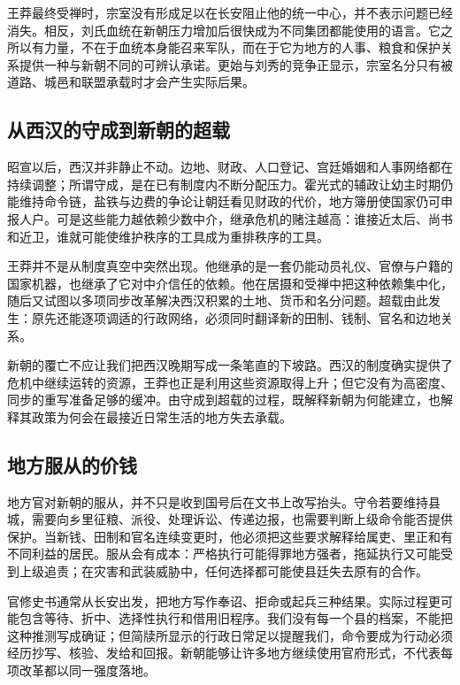 王莽最终受禅时，宗室没有形成足以在长安阻止他的统一中心，并不表示问题已经消失。相反，刘氏血统在新朝压力增加后很快成为不同集团都能使用的语言。它之所以有力量，不在于血统本身能召来军队，而在于它为地方的人事、粮食和保护关系提供一种与新朝不同的可辨认承诺。更始与刘秀的竞争正显示，宗室名分只有被道路、城邑和联盟承载时才会产生实际后果。

\subsection{从西汉的守成到新朝的超载}

昭宣以后，西汉并非静止不动。边地、财政、人口登记、宫廷婚姻和人事网络都在持续调整；所谓守成，是在已有制度内不断分配压力。霍光式的辅政让幼主时期仍能维持命令链，盐铁与边费的争论让朝廷看见财政的代价，地方簿册使国家仍可申报人户。可是这些能力越依赖少数中介，继承危机的赌注越高：谁接近太后、尚书和近卫，谁就可能使维护秩序的工具成为重排秩序的工具。

王莽并不是从制度真空中突然出现。他继承的是一套仍能动员礼仪、官僚与户籍的国家机器，也继承了它对中介信任的依赖。他在居摄和受禅中把这种依赖集中化，随后又试图以多项同步改革解决西汉积累的土地、货币和名分问题。超载由此发生：原先还能逐项调适的行政网络，必须同时翻译新的田制、钱制、官名和边地关系。

新朝的覆亡不应让我们把西汉晚期写成一条笔直的下坡路。西汉的制度确实提供了危机中继续运转的资源，王莽也正是利用这些资源取得上升；但它没有为高密度、同步的重写准备足够的缓冲。由守成到超载的过程，既解释新朝为何能建立，也解释其政策为何会在最接近日常生活的地方失去承载。

\subsection{地方服从的价钱}

地方官对新朝的服从，并不只是收到国号后在文书上改写抬头。守令若要维持县城，需要向乡里征粮、派役、处理诉讼、传递边报，也需要判断上级命令能否提供保护。当新钱、田制和官名连续变更时，他必须把这些要求解释给属吏、里正和有不同利益的居民。服从会有成本：严格执行可能得罪地方强者，拖延执行又可能受到上级追责；在灾害和武装威胁中，任何选择都可能使县廷失去原有的合作。

官修史书通常从长安出发，把地方写作奉诏、拒命或起兵三种结果。实际过程更可能包含等待、折中、选择性执行和借用旧程序。我们没有每一个县的档案，不能把这种推测写成确证；但简牍所显示的行政日常足以提醒我们，命令要成为行动必须经历抄写、核验、发给和回报。新朝能够让许多地方继续使用官府形式，不代表每项改革都以同一强度落地。

